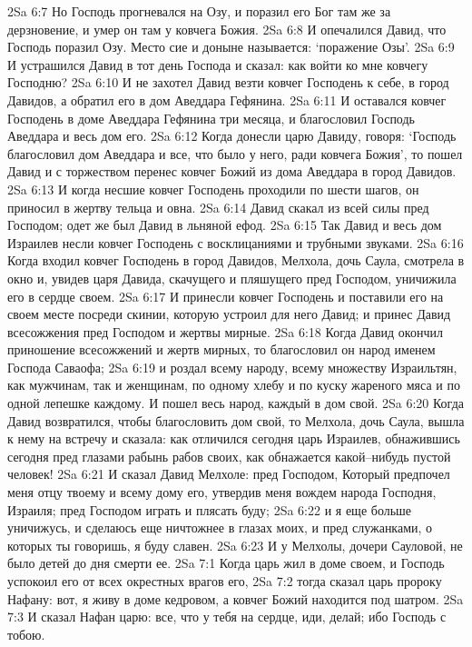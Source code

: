 2Sa 6:7  Но Господь прогневался на Озу, и поразил его Бог там же за дерзновение, и умер он там у ковчега Божия.
2Sa 6:8  И опечалился Давид, что Господь поразил Озу. Место сие и доныне называется: `поражение Озы'.
2Sa 6:9  И устрашился Давид в тот день Господа и сказал: как войти ко мне ковчегу Господню?
2Sa 6:10  И не захотел Давид везти ковчег Господень к себе, в город Давидов, а обратил его в дом Аведдара Гефянина.
2Sa 6:11  И оставался ковчег Господень в доме Аведдара Гефянина три месяца, и благословил Господь Аведдара и весь дом его.
2Sa 6:12  Когда донесли царю Давиду, говоря: `Господь благословил дом Аведдара и все, что было у него, ради ковчега Божия', то пошел Давид и с торжеством перенес ковчег Божий из дома Аведдара в город Давидов.
2Sa 6:13  И когда несшие ковчег Господень проходили по шести шагов, он приносил в жертву тельца и овна.
2Sa 6:14  Давид скакал из всей силы пред Господом; одет же был Давид в льняной ефод.
2Sa 6:15  Так Давид и весь дом Израилев несли ковчег Господень с восклицаниями и трубными звуками.
2Sa 6:16  Когда входил ковчег Господень в город Давидов, Мелхола, дочь Саула, смотрела в окно и, увидев царя Давида, скачущего и пляшущего пред Господом, уничижила его в сердце своем.
2Sa 6:17  И принесли ковчег Господень и поставили его на своем месте посреди скинии, которую устроил для него Давид; и принес Давид всесожжения пред Господом и жертвы мирные.
2Sa 6:18  Когда Давид окончил приношение всесожжений и жертв мирных, то благословил он народ именем Господа Саваофа;
2Sa 6:19  и роздал всему народу, всему множеству Израильтян, как мужчинам, так и женщинам, по одному хлебу и по куску жареного мяса и по одной лепешке каждому. И пошел весь народ, каждый в дом свой.
2Sa 6:20  Когда Давид возвратился, чтобы благословить дом свой, то Мелхола, дочь Саула, вышла к нему на встречу и сказала: как отличился сегодня царь Израилев, обнажившись сегодня пред глазами рабынь рабов своих, как обнажается какой--нибудь пустой человек!
2Sa 6:21  И сказал Давид Мелхоле: пред Господом, Который предпочел меня отцу твоему и всему дому его, утвердив меня вождем народа Господня, Израиля; пред Господом играть и плясать буду;
2Sa 6:22  и я еще больше уничижусь, и сделаюсь еще ничтожнее в глазах моих, и пред служанками, о которых ты говоришь, я буду славен.
2Sa 6:23  И у Мелхолы, дочери Сауловой, не было детей до дня смерти ее.
2Sa 7:1  Когда царь жил в доме своем, и Господь успокоил его от всех окрестных врагов его,
2Sa 7:2  тогда сказал царь пророку Нафану: вот, я живу в доме кедровом, а ковчег Божий находится под шатром.
2Sa 7:3  И сказал Нафан царю: все, что у тебя на сердце, иди, делай; ибо Господь с тобою.
